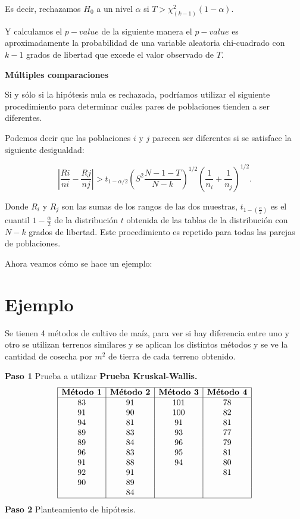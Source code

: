 \documentclass[
  a4paper,
  oneside,
  openany]{book}
\begin{document}
Es decir, rechazamos \(H_0\) a un nivel \(\alpha\) si \(T > \chi^2_{(k-1)}(1-\alpha).\)

Y calculamos el \(p-value\) de la siguiente manera el \(p-value\) es aproximadamente la probabilidad de una variable aleatoria chi-cuadrado con \(k-1\) grados de libertad que excede el valor observado de \(T\).

\textbf{Múltiples comparaciones}

Si y sólo si la hipótesis nula es rechazada, podríamos utilizar el siguiente procedimiento para determinar cuáles pares de poblaciones tienden a ser diferentes.

Podemos decir que las poblaciones \(i\) y \(j\) parecen ser diferentes si se satisface la siguiente desigualdad:

\[\left|\frac{Ri}{ni}- \frac{Rj}{nj}\right|> t_{1-\alpha/2}\left(S^2\frac{N-1-T}{N-k}\right)^{1/2}\left(\frac{1}{n_i}+\frac{1}{n_j}\right)^{1/2}.\]

Donde \(R_i\) y \(R_j\) son las sumas de los rangos de las dos muestras, \(t_{1-(\frac{\alpha}{2})}\) es el cuantil \(1-\frac{\alpha}{2}\) de la distribución \(t\) obtenida de las tablas de la distribución con \(N-k\) grados de libertad. Este procedimiento es repetido para todas las parejas de poblaciones.

Ahora veamos cómo se hace un ejemplo:

\hypertarget{ejemplo-7}{%
\section{Ejemplo}\label{ejemplo-7}}

Se tienen 4 métodos de cultivo de maíz, para ver si hay diferencia entre uno y otro se utilizan terrenos similares y se aplican los distintos métodos y se ve la cantidad de cosecha por \(m^2\) de tierra de cada terreno obtenido.

\textbf{Paso 1} Prueba a utilizar \textbf{Prueba Kruskal-Wallis.}
\[
\begin{array}{|c| c| c| c|} 
\hline
\textbf{Método 1} & \textbf{Método 2} & \textbf{Método 3} & \textbf{Método 4}\\
\hline
83&91&101&78\\
91&90&100&82\\
94&81&91&81\\
89&83&93&77\\
89&84&96&79\\
96&83&95&81\\
91&88&94&80\\
92&91&  &81\\
90&89&  &\\
  &84&  &\\
  \hline
\end{array}
\]
\textbf{Paso 2} Planteamiento de hipótesis.
\end{document}
